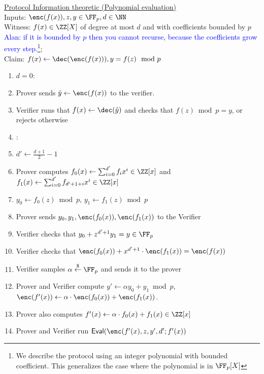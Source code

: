 \documentclass{article}
\theoremstyle{definition}
\begin{document}
\begin{small}
 \begin{minipage}{1.1\textwidth}
\begin{mdframed}[userdefinedwidth=1\textwidth]  \label{prot:Opening}
	\noindent \underline{\textsf{Protocol \eval{} Information theoretic} (Polynomial evaluation)}\\
Inputs: $\enc(f(x)),z,y\in \FF_p,d \in \NN $\\
Witness: $f(x) \in \ZZ[X]$ of degree at most $d$ and with coefficients bounded by $p$ \textcolor{blue}{Alan: if it is bounded by $p$ then you cannot recurse, because the coefficients grow every step.}\footnote{We describe the protocol using an integer polynomial with bounded coefficient. This generalizes the case where the polynomial is in $\FF_p[X]$};\\ 
Claim: $f(x)\gets \dec(\enc(f(x))), y=f(z) \mod p$

\begin{enumerate}[nolistsep]
\item \pcif $d=0$:
\item \pcind[1] Prover sends $\hat{y}\gets \enc(f(x))$ to the verifier. 
\item \pcind[1] Verifier runs that $f(x)\gets \dec(\hat{y})$ and checks that  $f(z) \bmod p=y$, or rejects otherwise 
\item \pcelse: 
\item \pcind[1] $d'\gets \frac{d+1}{2}-1$
\item \pcind[1] Prover computes $f_0(x)\gets\sum_{i=0}^{d'} f_i x^i\in \ZZ[x]$ and $f_1(x)\gets\sum_{i=0}^{d'} f_{d'+1+i} x^{i}\in \ZZ[x]$
\item \pcind[1] $y_0\gets f_0(z) \bmod p$, $y_1\gets f_1(z)\bmod p$
\item \pcind[1] Prover sends $y_0,y_1, \enc(f_0(x)),\enc(f_1(x))$ to the Verifier
\item \pcind[1] Verifier checks that $y_0+z^{d'+1} y_1=y\in \FF_p$ 
\item \pcind[1] Verifier checks that $\enc(f_0(x))+x^{d'+1}\cdot \enc(f_1(x))=\enc(f(x))$
\item \pcind[1] Verifier samples $\alpha \sample \FF_p$ and sends it to the prover
\item \pcind[1] Prover and Verifier compute $y'\gets\alpha y_0 +y_1 \bmod p$, $\enc(f'(x))\gets \alpha \cdot \enc(f_0(x)) +\enc(f_1(x))$. 
\item \pcind[1] Prover also computes $f'(x)\gets\alpha  \cdot f_0(x)+f_1(x) \in \ZZ[x]$ 
\item \pcind[1] Prover and Verifier run $\eval(\enc(f'(x),z,y',d';f'(x))$
\end{enumerate}
\end{mdframed}
\end{minipage}
\end{small}
\end{document}
